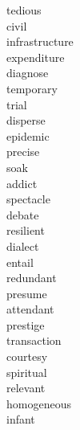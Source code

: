 \documentclass[a4paper, 10pt]{ctexart}
\begin{document}
\begin{multicols*}{2}
\begin{description}
\item[tedious]

\item[civil]

\item[infrastructure]

\item[expenditure]

\item[diagnose]

\item[temporary]

\item[trial]

\item[disperse]

\item[epidemic]

\item[precise]

\item[soak]

\item[addict]

\item[spectacle]

\item[debate]

\item[resilient]

\item[dialect]

\item[entail]

\item[redundant]

\item[presume]

\item[attendant]

\item[prestige]

\item[transaction]

\item[courtesy]

\item[spiritual]

\item[relevant]

\item[homogeneous]

\item[infant]


\end{description}
\end{multicols*}
\end{document}
